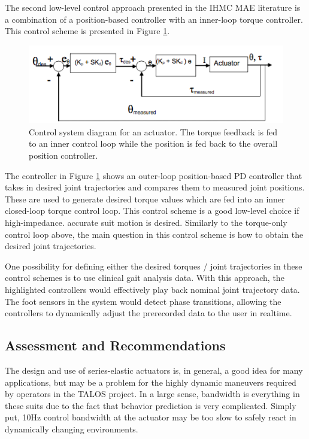\begin{refsection}
 The second low-level control approach presented in the IHMC MAE literature is a combination of a position-based controller with an inner-loop torque controller.  This control scheme is presented in Figure \ref{fig:IHMCPOS}.
  \begin{figure}[thpb]
\centering
\includegraphics[width=3.in]{exos/figs/ihmc/positionCon}
  \caption{Control system diagram for an actuator. The torque feedback is fed to an inner control loop while the position is fed back to the overall position controller.}
 \label{fig:IHMCPOS}   
 \end{figure}
 The controller in Figure \ref{fig:IHMCPOS} shows an outer-loop position-based PD controller that takes in desired joint trajectories and compares them to measured joint positions.  These are used to generate desired torque values which are fed into an inner closed-loop torque control loop.  This control scheme is a good low-level choice if high-impedance. accurate suit motion is desired.  Similarly to the torque-only control loop above, the main question in this control scheme is how to obtain the desired joint trajectories.  
 
 One possibility for defining either the desired torques / joint trajectories in these control schemes is to use clinical gait analysis data.  With this approach, the highlighted controllers would effectively play back nominal joint trajectory data.  The foot sensors in the system would detect phase transitions, allowing the controllers to dynamically adjust the prerecorded data to the user in realtime.
 
 
 \subsection{Assessment and Recommendations}
 
 The design and use of series-elastic actuators is, in general, a good idea for many applications, but may be a problem for the highly dynamic maneuvers required by operators in the TALOS project.  In a large sense, bandwidth is everything in these suits due to the fact that behavior prediction is very complicated.  Simply put, 10Hz control bandwidth at the actuator may be too slow to safely react in dynamically changing environments. 
 

\end{refsection}
